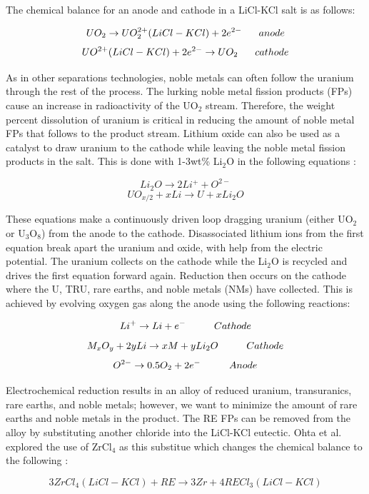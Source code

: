 The chemical balance for an anode and cathode in a LiCl-KCl salt is as follows:

\[ UO_2 \rightarrow UO_2^{2+}(LiCl-KCl) + 2e^{2-} \hspace{6mm} anode \]
\[ UO^{2+}(LiCl-KCl) + 2e^{2-} \rightarrow UO_2 \hspace{6mm} cathode \]

As in other separations technologies, noble metals can often follow the uranium through the rest of the process.
The lurking noble metal fission products (FPs) cause an increase in radioactivity of the UO$_2$ stream. 
Therefore, the weight percent dissolution of uranium is critical in reducing the amount of noble metal FPs that follows to the product stream.
Lithium oxide can also be used as a catalyst to draw uranium to the cathode while leaving the noble metal fission products in the salt.
This is done with 1-3wt\% Li$_2$O in the following equations \cite{hur_electrochemical_nodate}:

\[ Li_2O \rightarrow 2Li^+ + O^{2-} \]
\[ UO_{x/2} + xLi \rightarrow U + xLi_2O \]

These equations make a continuously driven loop dragging uranium (either UO$_2$ or U$_3$O$_8$) from the anode to the cathode. 
Disassociated lithium ions from the first equation break apart the uranium and oxide, with help from the electric potential.
The uranium collects on the cathode while the Li$_2$O is recycled and drives the first equation forward again. 
Reduction then occurs on the cathode where the U, TRU, rare earths, and noble metals (NMs) have collected.
This is achieved by evolving oxygen gas along the anode using the following reactions\cite{hur_electrochemical_nodate,organisation}:

\[ Li^+ \rightarrow Li + e^- \hspace{10mm} Cathode \]
\[ M_xO_y + 2yLi \rightarrow xM + yLi_2O \hspace{10mm} Cathode \]
\[ O^{2-} \rightarrow 0.5O_2 + 2e^- \hspace{10mm} Anode \]

Electrochemical reduction results in an alloy of reduced uranium, transuranics, rare earths, and noble metals; however, we want to minimize the amount of rare earths and noble metals in the product.
The RE FPs can be removed from the alloy by substituting another chloride into the LiCl-KCl eutectic.
Ohta et al. explored the use of ZrCl$_4$ as this substitue which changes the chemical balance to the following \cite{ohta}:

\[ 3ZrCl_4(LiCl-KCl) + RE \rightarrow 3Zr + 4RECl_3(LiCl-KCl) \]

